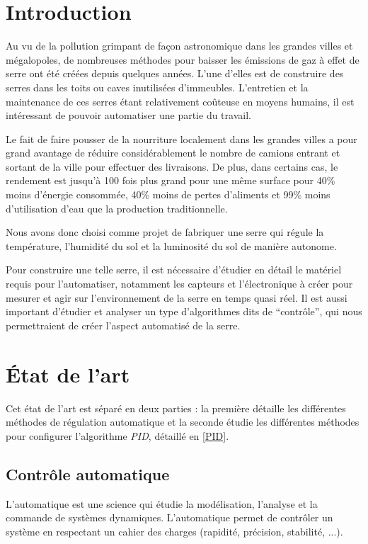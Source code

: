 \documentclass[a4paper,10pt]{report}
\begin{document}
\tableofcontents

\chapter{Introduction}

Au vu de la pollution grimpant de façon astronomique dans les grandes villes et mégalopoles, de nombreuses méthodes pour baisser les émissions de gaz à effet de serre ont été créées depuis quelques années. L'une d'elles est de construire des serres dans les toits ou caves inutilisées d'immeubles. L'entretien et la maintenance de ces serres étant relativement coûteuse en moyens humains, il est intéressant de pouvoir automatiser une partie du travail.


Le fait de faire pousser de la nourriture localement dans les grandes villes a pour grand avantage de réduire considérablement le nombre de camions entrant et sortant de la ville pour effectuer des livraisons. De plus, dans certains cas, le rendement est jusqu'à 100 fois plus grand pour une même surface pour 40\% moins d'énergie consommée, 40\% moins de pertes d'aliments et 99\% moins d'utilisation d'eau que la production traditionnelle. \cite{GEReports}

Nous avons donc choisi comme projet de fabriquer une serre qui régule la température, l'humidité du sol et la luminosité du sol de manière autonome.

Pour construire une telle serre, il est nécessaire d'étudier en détail le matériel requis pour l'automatiser, notamment les capteurs et l'électronique à créer pour mesurer et agir sur l'environnement de la serre en temps quasi réel.
Il est aussi important d'étudier et analyser un type d'algorithmes dits de ``contrôle'', qui nous permettraient de créer l'aspect automatisé de la serre.


\chapter{État de l'art}

Cet état de l'art est séparé en deux parties : la première détaille les différentes méthodes de régulation automatique et la seconde étudie les différentes méthodes pour configurer l'algorithme \emph{PID}, détaillé en \ref{PID}.

\section{Contrôle automatique}
L’automatique est une science qui étudie la modélisation, l’analyse et la commande de systèmes dynamiques.
L’automatique permet de contrôler un système en respectant un cahier des charges (rapidité, précision, stabilité, ...).
\end{document}

